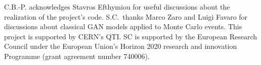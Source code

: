\documentclass[twocolumn,preprintnumbers,superscriptaddress]{revtex4-2}
\begin{document}
\acknowledgments

C.B.-P. acknowledges Stavros Efthymiou for useful discussions about the
realization of the project's code. S.C.~thanks Marco Zaro and Luigi Favaro for
discussions about classical GAN models applied to Monte Carlo events. This
project is supported by CERN's QTI. SC is supported by the European Research
Council under the European Union's Horizon 2020 research and innovation
Programme (grant agreement number 740006).


\end{document}
